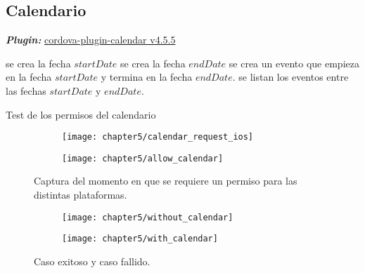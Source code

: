 \subsection{Calendario}
\textbf{\emph{Plugin:}} \href{https://www.npmjs.com/package/cordova-plugin-calendar}{cordova-plugin-calendar v4.5.5}
\begin{algorithm}
	\begin{algorithmic}[1]
		\STATE se crea la fecha $startDate$
		\STATE se crea la fecha $endDate$
		\STATE se crea un evento que empieza en la fecha $startDate$ y termina en la fecha $endDate$.
		\STATE se listan los eventos entre las fechas $startDate$ y $endDate$.
	\end{algorithmic}
	\caption{Test de los permisos del calendario}\label{alg:chap5:test_calendario}
\end{algorithm}

\begin{figure}[hbtp]
    \centering
    \begin{subfigure}{0.3\linewidth}
        \texttt{[image: chapter5/calendar\_request\_ios]}
    \end{subfigure}
    \begin{subfigure}{0.3\linewidth}
        \texttt{[image: chapter5/allow\_calendar]}
    \end{subfigure}
    \caption{Captura del momento en que se requiere un permiso para las distintas plataformas.}
	\label{fig:ch05:app-permissions-allow}
\end{figure}
\begin{figure}[hbtp]
    \centering
    \begin{subfigure}{0.3\linewidth}
        \texttt{[image: chapter5/without\_calendar]}
        \label{fig:chapter05:without_calendar}
    \end{subfigure}
    \begin{subfigure}{0.3\linewidth}
        \texttt{[image: chapter5/with\_calendar]}
        \label{fig:chapter05:with_calendar}
    \end{subfigure}
    \caption{Caso exitoso y caso fallido.}
	\label{fig:ch05:calendar-cases}
\end{figure}
\newpage
